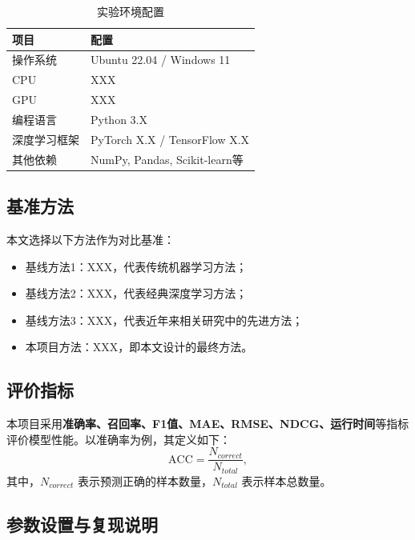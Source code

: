 \documentclass{style/course-report}
\begin{document}
\begin{table}[H]
    \centering
    \caption{实验环境配置}
    \begin{tabular}{ll}
        \toprule
        项目 & 配置 \\
        \midrule
        操作系统 & Ubuntu 22.04 / Windows 11 \\
        CPU & XXX \\
        GPU & XXX \\
        编程语言 & Python 3.X \\
        深度学习框架 & PyTorch X.X / TensorFlow X.X \\
        其他依赖 & NumPy, Pandas, Scikit-learn等 \\
        \bottomrule
    \end{tabular}
    \label{tab:env}
\end{table}

\subsection{基准方法}

本文选择以下方法作为对比基准：
\begin{itemize}
    \item 基线方法1：XXX，代表传统机器学习方法；
    \item 基线方法2：XXX，代表经典深度学习方法；
    \item 基线方法3：XXX，代表近年来相关研究中的先进方法；
    \item 本项目方法：XXX，即本文设计的最终方法。
\end{itemize}

\subsection{评价指标}

本项目采用\textbf{准确率、召回率、F1值、MAE、RMSE、NDCG、运行时间}等指标评价模型性能。以准确率为例，其定义如下：
\begin{equation}
    \mathrm{ACC}=\frac{N_{correct}}{N_{total}},
    \label{eq:acc}
\end{equation}
其中，$N_{correct}$ 表示预测正确的样本数量，$N_{total}$ 表示样本总数量。

\subsection{参数设置与复现说明}
\end{document}
